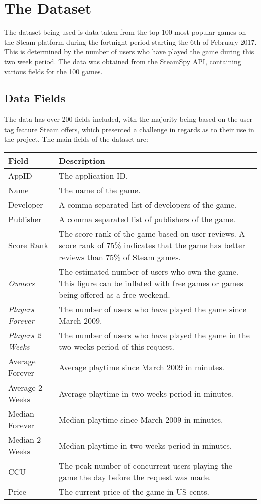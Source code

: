 \documentclass[dataset.tex]{subfiles}
\begin{document}
\section{The Dataset} %
\label{sec:dataset}
The dataset being used is data taken from the top 100 most popular games on the
Steam platform during the fortnight period starting the 6th of February 2017.
This is determined by the number of users who have played the game during this
two week period. The data was obtained from the SteamSpy API, containing various
fields for the 100 games.

\subsection{Data Fields} %
\label{sub:data_fields}
The data has over 200 fields included, with the majority being based on the user
tag feature Steam offers, which presented a challenge in regards as to their use
in the project. The main fields of the dataset are:

\begin{table}[H]
	\centering
	\begin{tabularx}{\textwidth}{|l|X|}
		\hline
		Field & Description \\
		\hline
		AppID & The application ID. \\
		\hline
		Name & The name of the game. \\
		\hline
		Developer & A comma separated list of developers of the game. \\
		\hline
		Publisher & A comma separated list of publishers of the game. \\
		\hline
		Score Rank & The score rank of the game based on user reviews. A score
		rank of 75\% indicates that the game has better reviews than 75\% of
		Steam games. \\
		\hline
		\emph{Owners} & The estimated number of users who own the game. This
		figure can be inflated with free games or games being offered as a free
		weekend. \\
		\hline
		\emph{Players Forever} & The number of users who have played the game
		since March 2009. \\
		\hline
		\emph{Players 2 Weeks} & The number of users who have played the game in
		the two weeks period of this request. \\
		\hline
		Average Forever & Average playtime since March 2009 in minutes.\\
		\hline
		Average 2 Weeks & Average playtime in two weeks period in minutes. \\
		\hline
		Median Forever & Median playtime since March 2009 in minutes. \\
		\hline
		Median 2 Weeks & Median playtime in two weeks period in minutes. \\
		\hline
		CCU & The peak number of concurrent users playing the game the day
		before the request was made. \\
		\hline
		Price & The current price of the game in US cents. \\
		\hline
	\end{tabularx}
	\vspace{1ex}
\end{table}
\end{document}
